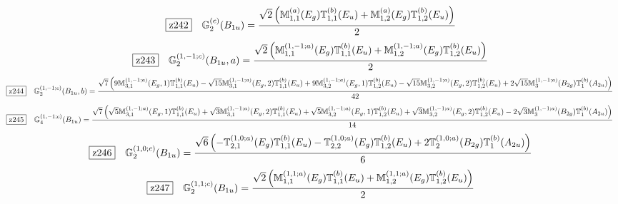 \documentclass[fleqn,10pt,landscape]{jsarticle}
\begin{document}
\begin{dmath*}
\hspace*{3mm}\fbox{z242}\quad \mathbb{G}_{2}^{(c)}(B_{1u})=\frac{\sqrt{2} \left(\mathbb{M}_{1,1}^{(a)}(E_{g}) \mathbb{T}_{1,1}^{(b)}(E_{u}) + \mathbb{M}_{1,2}^{(a)}(E_{g}) \mathbb{T}_{1,2}^{(b)}(E_{u})\right)}{2}
\end{dmath*}
\begin{dmath*}
\hspace*{3mm}\fbox{z243}\quad \mathbb{G}_{2}^{(1,-1;c)}(B_{1u},a)=\frac{\sqrt{2} \left(\mathbb{M}_{1,1}^{(1,-1;a)}(E_{g}) \mathbb{T}_{1,1}^{(b)}(E_{u}) + \mathbb{M}_{1,2}^{(1,-1;a)}(E_{g}) \mathbb{T}_{1,2}^{(b)}(E_{u})\right)}{2}
\end{dmath*}
\begin{dmath*}
\hspace*{3mm}\fbox{z244}\quad \mathbb{G}_{2}^{(1,-1;c)}(B_{1u},b)=\frac{\sqrt{7} \left(9 \mathbb{M}_{3,1}^{(1,-1;a)}(E_{g},1) \mathbb{T}_{1,1}^{(b)}(E_{u}) - \sqrt{15} \mathbb{M}_{3,1}^{(1,-1;a)}(E_{g},2) \mathbb{T}_{1,1}^{(b)}(E_{u}) + 9 \mathbb{M}_{3,2}^{(1,-1;a)}(E_{g},1) \mathbb{T}_{1,2}^{(b)}(E_{u}) - \sqrt{15} \mathbb{M}_{3,2}^{(1,-1;a)}(E_{g},2) \mathbb{T}_{1,2}^{(b)}(E_{u}) + 2 \sqrt{15} \mathbb{M}_{3}^{(1,-1;a)}(B_{2g}) \mathbb{T}_{1}^{(b)}(A_{2u})\right)}{42}
\end{dmath*}
\begin{dmath*}
\hspace*{3mm}\fbox{z245}\quad \mathbb{G}_{4}^{(1,-1;c)}(B_{1u})=\frac{\sqrt{7} \left(\sqrt{5} \mathbb{M}_{3,1}^{(1,-1;a)}(E_{g},1) \mathbb{T}_{1,1}^{(b)}(E_{u}) + \sqrt{3} \mathbb{M}_{3,1}^{(1,-1;a)}(E_{g},2) \mathbb{T}_{1,1}^{(b)}(E_{u}) + \sqrt{5} \mathbb{M}_{3,2}^{(1,-1;a)}(E_{g},1) \mathbb{T}_{1,2}^{(b)}(E_{u}) + \sqrt{3} \mathbb{M}_{3,2}^{(1,-1;a)}(E_{g},2) \mathbb{T}_{1,2}^{(b)}(E_{u}) - 2 \sqrt{3} \mathbb{M}_{3}^{(1,-1;a)}(B_{2g}) \mathbb{T}_{1}^{(b)}(A_{2u})\right)}{14}
\end{dmath*}
\begin{dmath*}
\hspace*{3mm}\fbox{z246}\quad \mathbb{G}_{2}^{(1,0;c)}(B_{1u})=\frac{\sqrt{6} \left(- \mathbb{T}_{2,1}^{(1,0;a)}(E_{g}) \mathbb{T}_{1,1}^{(b)}(E_{u}) - \mathbb{T}_{2,2}^{(1,0;a)}(E_{g}) \mathbb{T}_{1,2}^{(b)}(E_{u}) + 2 \mathbb{T}_{2}^{(1,0;a)}(B_{2g}) \mathbb{T}_{1}^{(b)}(A_{2u})\right)}{6}
\end{dmath*}
\begin{dmath*}
\hspace*{3mm}\fbox{z247}\quad \mathbb{G}_{2}^{(1,1;c)}(B_{1u})=\frac{\sqrt{2} \left(\mathbb{M}_{1,1}^{(1,1;a)}(E_{g}) \mathbb{T}_{1,1}^{(b)}(E_{u}) + \mathbb{M}_{1,2}^{(1,1;a)}(E_{g}) \mathbb{T}_{1,2}^{(b)}(E_{u})\right)}{2}
\end{dmath*}
\end{document}

